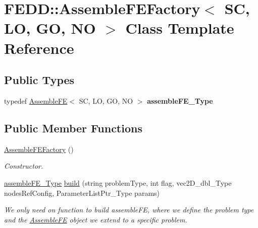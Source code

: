 \hypertarget{classFEDD_1_1AssembleFEFactory}{}\section{F\+E\+DD\+:\+:Assemble\+F\+E\+Factory$<$ SC, LO, GO, NO $>$ Class Template Reference}
\label{classFEDD_1_1AssembleFEFactory}
\subsection*{Public Types}
\begin{DoxyCompactItemize}
\item 
\mbox{\label{classFEDD_1_1AssembleFEFactory_a94c5faba8ae5d25550d09b14b285e5a6}} 
typedef \hyperlink{classFEDD_1_1AssembleFE}{Assemble\+FE}$<$ SC, LO, GO, NO $>$ {\bfseries assemble\+F\+E\+\_\+\+Type}
\end{DoxyCompactItemize}
\subsection*{Public Member Functions}
\begin{DoxyCompactItemize}
\item 
\mbox{\label{classFEDD_1_1AssembleFEFactory_a29b1ce08865f9d32e7011e208a4cebb9}} 
\hyperlink{classFEDD_1_1AssembleFEFactory_a29b1ce08865f9d32e7011e208a4cebb9}{Assemble\+F\+E\+Factory} ()
\begin{DoxyCompactList}\small\item\em Constructor. \end{DoxyCompactList}\item 
\hyperlink{classFEDD_1_1AssembleFE}{assemble\+F\+E\+\_\+\+Type} \hyperlink{classFEDD_1_1AssembleFEFactory_aae2a2023f0d280dbfbbd733eb28524ae}{build} (string problem\+Type, int flag, vec2\+D\+\_\+dbl\+\_\+\+Type nodes\+Ref\+Config, Parameter\+List\+Ptr\+\_\+\+Type params)
\begin{DoxyCompactList}\small\item\em We only need on function to build assemble\+FE, where we define the problem type and the \hyperlink{classFEDD_1_1AssembleFE}{Assemble\+FE} object we extend to a specific problem. \end{DoxyCompactList}\end{DoxyCompactItemize}


